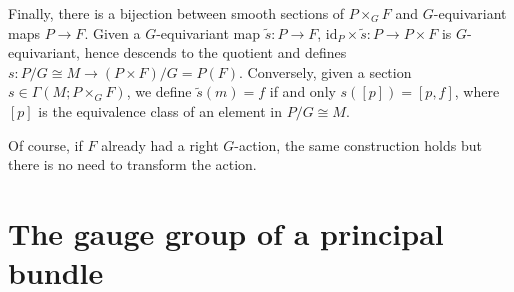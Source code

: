 Finally, there is a bijection between smooth sections of \(P \times_GF\) and \(G\)-equivariant maps \(P \to F\). Given a \(G\)-equivariant map \(\tilde{s}\colon P \to F\), \(\mathrm{id}_P \times \tilde{s}\colon P \to P \times F\) is \(G\)-equivariant, hence descends to the quotient and defines \(s\colon P/G \cong M\to (P \times F)/G=P(F)\). Conversely, given a section \(s\in \Gamma(M;P \times_GF)\), we define \(\tilde{s}(m)=f\) if and only \(s([p])=[p,f]\), where \([p]\) is the equivalence class of an element in \(P/G\cong M\). 

\begin{obs}
    Of course, if \(F\) already had a right \(G\)-action, the same construction holds but there is no need to transform the action.
\end{obs}

\section{The gauge group of a principal bundle} \label{section_gauge_group}





